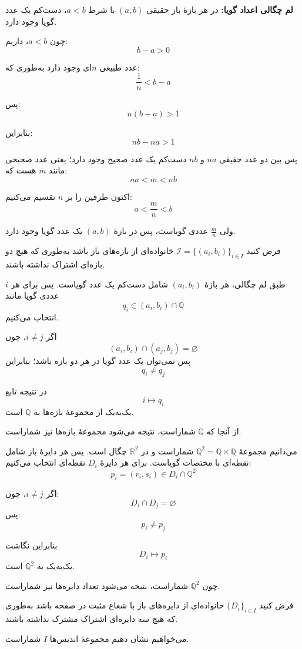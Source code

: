 
\textbf{لم چگالی اعداد گویا:}
در هر بازهٔ باز حقیقی $(a,b)$ با شرط $a<b$، دست‌کم یک عدد گویا وجود دارد.

چون $a<b$، داریم:
\[
b-a>0
\]

عدد طبیعی $n$ای وجود دارد به‌طوری که:
\[
\frac1n<b-a
\]

پس:
\[
n(b-a)>1
\]

بنابراین:
\[
nb-na>1
\]

پس بین دو عدد حقیقی $na$ و $nb$ دست‌کم یک عدد صحیح وجود دارد؛
یعنی عدد صحیحی مانند $m$ هست که:
\[
na<m<nb
\]

اکنون طرفین را بر $n$ تقسیم می‌کنیم:
\[
a<\frac{m}{n}<b
\]

ولی $\frac{m}{n}$ عددی گویاست، پس در بازهٔ $(a,b)$ یک عدد گویا وجود دارد.


فرض کنید
\(
\mathcal{I}=\{(a_i,b_i)\}_{i\in I}
\)
خانواده‌ای از بازه‌های باز باشد به‌طوری که هیچ دو بازه‌ای اشتراک نداشته باشند.

طبق لم چگالی، هر بازهٔ $(a_i,b_i)$ شامل دست‌کم یک عدد گویاست.  
پس برای هر $i$ عددی گویا مانند
\[
q_i\in(a_i,b_i)\cap\mathbb{Q}
\]
انتخاب می‌کنیم.

اگر $i\neq j$، چون
\[
(a_i,b_i)\cap(a_j,b_j)=\varnothing
\]
پس نمی‌توان یک عدد گویا در هر دو بازه باشد؛ بنابراین
\[
q_i\neq q_j
\]

در نتیجه تابع
\[
i\mapsto q_i
\]
یک‌به‌یک از مجموعهٔ بازه‌ها به $\mathbb{Q}$ است.

از آنجا که $\mathbb{Q}$ شماراست، نتیجه می‌شود مجموعهٔ بازه‌ها نیز شماراست.


می‌دانیم مجموعهٔ
\(
\mathbb{Q}^2=\mathbb{Q}\times\mathbb{Q}
\)
شماراست و در $\mathbb{R}^2$ چگال است.
پس هر دایرهٔ باز شامل نقطه‌ای با مختصات گویاست.
برای هر دایرهٔ $D_i$ نقطه‌ای انتخاب می‌کنیم:
\[
p_i=(r_i,s_i)\in D_i\cap\mathbb{Q}^2
\]

اگر $i\neq j$، چون:
\[
D_i\cap D_j=\varnothing
\]
پس:
\[
p_i\neq p_j
\]

بنابراین نگاشت
\[
D_i\mapsto p_i
\]
یک‌به‌یک به $\mathbb{Q}^2$ است.

چون $\mathbb{Q}^2$ شماراست، نتیجه می‌شود تعداد دایره‌ها نیز شماراست.



فرض کنید $\{D_i\}_{i\in I}$ خانواده‌ای از دایره‌های باز با شعاع مثبت در صفحه باشد به‌طوری که هیچ سه دایره‌ای اشتراک مشترک نداشته باشند.

می‌خواهیم نشان دهیم مجموعهٔ اندیس‌ها $I$ شماراست.

